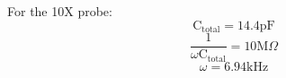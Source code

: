\documentclass[12pt,letterpaper]{report}
\begin{document}
For the 10X probe:
$$\text{C}_{\text{total}} = 14.4 \text{pF}$$
$$ \frac{1}{\omega \text{C}_{\text{total}}} = 10\text{M}\Omega$$
$$ \omega = 6.94 \text{kHz} $$

%
%
%
%
%
%
\end{document}
